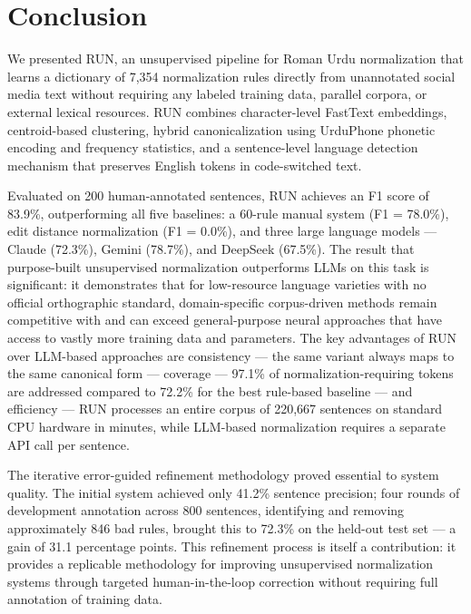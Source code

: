 \documentclass[11pt]{article}
\begin{document}
\section{Conclusion}
We presented RUN, an unsupervised pipeline for Roman Urdu normalization that learns a dictionary of 7,354 normalization rules directly from unannotated social media text without requiring any labeled training data, parallel corpora, or external lexical resources. RUN combines character-level FastText embeddings, centroid-based clustering, hybrid canonicalization using UrduPhone phonetic encoding and frequency statistics, and a sentence-level language detection mechanism that preserves English tokens in code-switched text.

Evaluated on 200 human-annotated sentences, RUN achieves an F1 score of 83.9\%, outperforming all five baselines: a 60-rule manual system (F1 = 78.0\%), edit distance normalization (F1 = 0.0\%), and three large language models — Claude (72.3\%), Gemini (78.7\%), and DeepSeek (67.5\%). The result that purpose-built unsupervised normalization outperforms LLMs on this task is significant: it demonstrates that for low-resource language varieties with no official orthographic standard, domain-specific corpus-driven methods remain competitive with and can exceed general-purpose neural approaches that have access to vastly more training data and parameters. The key advantages of RUN over LLM-based approaches are consistency — the same variant always maps to the same canonical form — coverage — 97.1\% of normalization-requiring tokens are addressed compared to 72.2\% for the best rule-based baseline — and efficiency — RUN processes an entire corpus of 220,667 sentences on standard CPU hardware in minutes, while LLM-based normalization requires a separate API call per sentence.

The iterative error-guided refinement methodology proved essential to system quality. The initial system achieved only 41.2\% sentence precision; four rounds of development annotation across 800 sentences, identifying and removing approximately 846 bad rules, brought this to 72.3\% on the held-out test set — a gain of 31.1 percentage points. This refinement process is itself a contribution: it provides a replicable methodology for improving unsupervised normalization systems through targeted human-in-the-loop correction without requiring full annotation of training data.
\end{document}
